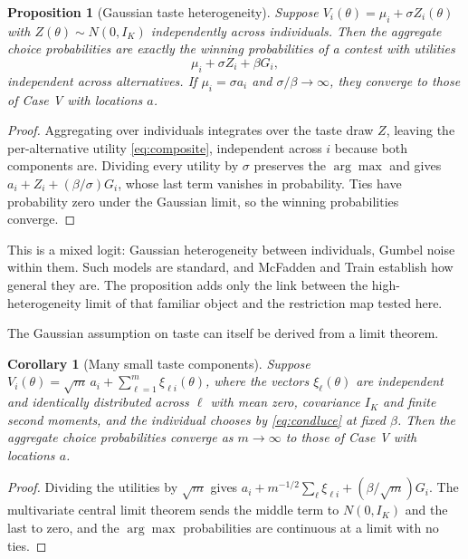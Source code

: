 \documentclass[11pt]{article}
\newtheorem{proposition}{Proposition}
\newtheorem{corollary}{Corollary}
\begin{document}
\begin{proposition}[Gaussian taste heterogeneity]
\label{prop:mixture}
Suppose $V_i(\theta) = \mu_i + \sigma Z_i(\theta)$ with $Z(\theta) \sim N(0,I_K)$
independently across individuals. Then the aggregate choice probabilities are exactly the
winning probabilities of a contest with utilities
\begin{equation}
\mu_i + \sigma Z_i + \beta G_i ,
\label{eq:composite}
\end{equation}
independent across alternatives. If $\mu_i = \sigma a_i$ and $\sigma/\beta \to \infty$, they
converge to those of Case V with locations $a$.
\end{proposition}

\begin{proof}
Aggregating over individuals integrates over the taste draw $Z$, leaving the
per-alternative utility \eqref{eq:composite}, independent across $i$ because both
components are. Dividing every utility by $\sigma$ preserves the $\arg\max$ and gives
$a_i + Z_i + (\beta/\sigma)G_i$, whose last term vanishes in probability. Ties have
probability zero under the Gaussian limit, so the winning probabilities converge.
\end{proof}

This is a mixed logit: Gaussian heterogeneity between individuals, Gumbel noise within
them. Such models are standard, and McFadden and Train \cite{mcfaddentrain2000} establish
how general they are. The proposition adds only the link between the high-heterogeneity limit of
that familiar object and the restriction map tested here.

The Gaussian assumption on taste can itself be derived from a limit theorem.

\begin{corollary}[Many small taste components]
\label{cor:clt}
Suppose $V_i(\theta) = \sqrt{m}\,a_i + \sum_{\ell=1}^{m}\xi_{\ell i}(\theta)$, where the
vectors $\xi_\ell(\theta)$ are independent and identically distributed across $\ell$ with mean
zero, covariance $I_K$ and finite second moments, and the individual chooses by \eqref{eq:condluce} at fixed
$\beta$. Then the aggregate choice probabilities converge as $m \to \infty$ to those of
Case V with locations $a$.
\end{corollary}

\begin{proof}
Dividing the utilities by $\sqrt{m}$ gives
$a_i + m^{-1/2}\sum_\ell \xi_{\ell i} + (\beta/\sqrt{m})G_i$. The multivariate central limit
theorem sends the middle term to $N(0,I_K)$ and the last to zero, and the $\arg\max$
probabilities are continuous at a limit with no ties.
\end{proof}
\end{document}
